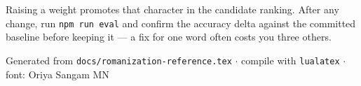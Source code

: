 \documentclass[11pt, a4paper]{article}
\begin{document}
Raising a weight promotes that character in the candidate ranking. After any change, run
\texttt{npm run eval} and confirm the accuracy delta against the committed baseline
before keeping it --- a fix for one word often costs you three others.

\vfill
\begin{center}
\small\color{gray}
Generated from \texttt{docs/romanization-reference.tex} \quad$\cdot$\quad
compile with \texttt{lualatex} \quad$\cdot$\quad
font: Oriya Sangam MN
\end{center}
\end{document}

